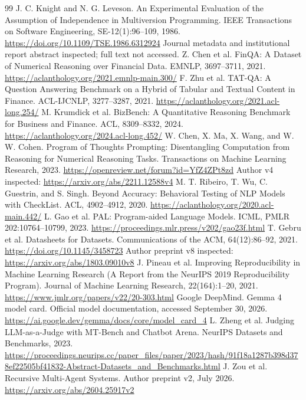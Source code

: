 \begin{thebibliography}{99}
 J. C. Knight and N. G. Leveson. An Experimental Evaluation of the Assumption of Independence in Multiversion Programming. IEEE Transactions on Software Engineering, SE-12(1):96--109, 1986. \url{https://doi.org/10.1109/TSE.1986.6312924} Journal metadata and institutional report abstract inspected; full text not accessed.
 Z. Chen et al. FinQA: A Dataset of Numerical Reasoning over Financial Data. EMNLP, 3697--3711, 2021. \url{https://aclanthology.org/2021.emnlp-main.300/}
 F. Zhu et al. TAT-QA: A Question Answering Benchmark on a Hybrid of Tabular and Textual Content in Finance. ACL-IJCNLP, 3277--3287, 2021. \url{https://aclanthology.org/2021.acl-long.254/}
 M. Krumdick et al. BizBench: A Quantitative Reasoning Benchmark for Business and Finance. ACL, 8309--8332, 2024. \url{https://aclanthology.org/2024.acl-long.452/}
 W. Chen, X. Ma, X. Wang, and W. W. Cohen. Program of Thoughts Prompting: Disentangling Computation from Reasoning for Numerical Reasoning Tasks. Transactions on Machine Learning Research, 2023. \url{https://openreview.net/forum?id=YfZ4ZPt8zd} Author v4 inspected: \url{https://arxiv.org/abs/2211.12588v4}
 M. T. Ribeiro, T. Wu, C. Guestrin, and S. Singh. Beyond Accuracy: Behavioral Testing of NLP Models with CheckList. ACL, 4902--4912, 2020. \url{https://aclanthology.org/2020.acl-main.442/}
 L. Gao et al. PAL: Program-aided Language Models. ICML, PMLR 202:10764--10799, 2023. \url{https://proceedings.mlr.press/v202/gao23f.html}
 T. Gebru et al. Datasheets for Datasets. Communications of the ACM, 64(12):86--92, 2021. \url{https://doi.org/10.1145/3458723} Author preprint v8 inspected: \url{https://arxiv.org/abs/1803.09010v8}
 J. Pineau et al. Improving Reproducibility in Machine Learning Research (A Report from the NeurIPS 2019 Reproducibility Program). Journal of Machine Learning Research, 22(164):1--20, 2021. \url{https://www.jmlr.org/papers/v22/20-303.html}
 Google DeepMind. Gemma 4 model card. Official model documentation, accessed September 30, 2026. \url{https://ai.google.dev/gemma/docs/core/model_card_4}
 L. Zheng et al. Judging LLM-as-a-Judge with MT-Bench and Chatbot Arena. NeurIPS Datasets and Benchmarks, 2023. \url{https://proceedings.neurips.cc/paper_files/paper/2023/hash/91f18a1287b398d378ef22505bf41832-Abstract-Datasets_and_Benchmarks.html}
 J. Zou et al. Recursive Multi-Agent Systems. Author preprint v2, July 2026. \url{https://arxiv.org/abs/2604.25917v2}

\end{thebibliography}
